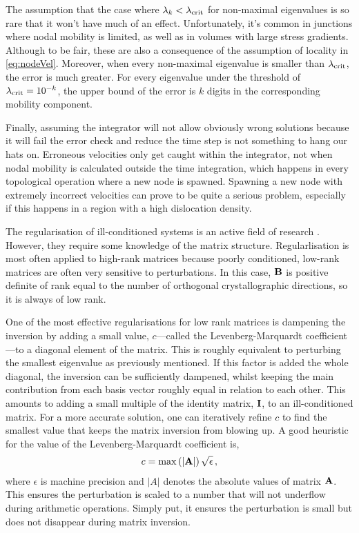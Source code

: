 The assumption that the case where $\lambda_k < \lambda_{\textrm{crit}}$ for non-maximal eigenvalues is so rare that it won't have much of an effect. Unfortunately, it's common in junctions where nodal mobility is limited, as well as in volumes with large stress gradients. Although to be fair, these are also a consequence of the assumption of locality in \cref{eq:nodeVel}. Moreover, when every non-maximal eigenvalue is smaller than $\lambda_{\textrm{crit}}$, the error is much greater. For every eigenvalue under the threshold of $\lambda_{\textrm{crit}} = 10^{-k}$, the upper bound of the error is $k$ digits in the corresponding mobility component.

Finally, assuming the integrator will not allow obviously wrong solutions because it will fail the error check and reduce the time step is not something to hang our hats on. Erroneous velocities only get caught within the integrator, not when nodal mobility is calculated outside the time integration, which happens in every topological operation where a new node is spawned. Spawning a new node with extremely incorrect velocities can prove to be quite a serious problem, especially if this happens in a region with a high dislocation density.

The regularisation of ill-conditioned systems is an active field of research \cite{regularisation1,regularisation2,regularisation3}. However, they require some knowledge of the matrix structure. Regularlisation is most often applied to high-rank matrices because poorly conditioned, low-rank matrices are often very sensitive to perturbations. In this case, $\mathbf{B}$ is positive definite of rank equal to the number of orthogonal crystallographic directions, so it is always of low rank.

One of the most effective regularisations for low rank matrices is dampening the inversion by adding a small value, $c$---called the Levenberg-Marquardt coefficient---to a diagonal element of the matrix. This is roughly equivalent to perturbing the smallest eigenvalue as previously mentioned. If this factor is added the whole diagonal, the inversion can be sufficiently dampened, whilst keeping the main contribution from each basis vector roughly equal in relation to each other. This amounts to adding a small multiple of the identity matrix, $\mathbf{I}$, to an ill-conditioned matrix. For a more accurate solution, one can iteratively refine $c$ to find the smallest value that keeps the matrix inversion from blowing up. A good heuristic for the value of the Levenberg-Marquardt coefficient is,
\begin{align}\label{eq:marquardt}
    c = \max\left(\lvert\mathbf{A}\rvert\right) \sqrt{\epsilon}\,,
\end{align}
where $\epsilon$ is machine precision and $\lvert A\rvert$ denotes the absolute values of matrix $\mathbf{A}$. This ensures the perturbation is scaled to a number that will not underflow during arithmetic operations. Simply put, it ensures the perturbation is small but does not disappear during matrix inversion.

